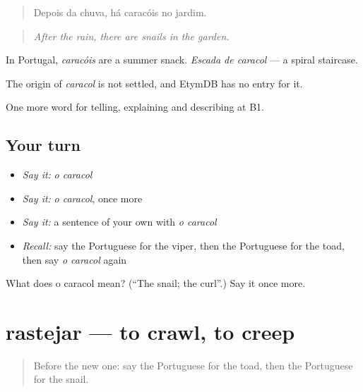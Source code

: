 \begin{quote}
Depois da chuva, há caracóis no jardim.
\end{quote}

\begin{quote}
\emph{After the rain, there are snails in the garden.}
\end{quote}

In Portugal, \emph{caracóis} are a summer snack. \emph{Escada de caracol} — a spiral staircase.

\begin{cousinweb}
The origin of \emph{caracol} is not settled, and EtymDB has no entry for it.
\end{cousinweb}

\begin{grammarlens}[title={What you've built}]
One more word for telling, explaining and describing at B1.
\end{grammarlens}

\subsection*{Your turn}
\begin{itemize}
\raggedright
  \item \emph{Say it:} \emph{o caracol}
  \item \emph{Say it:} \emph{o caracol}, once more
  \item \emph{Say it:} a sentence of your own with \emph{o caracol}
  \item \emph{Recall:} say the Portuguese for the viper, then the Portuguese for the toad, then say \emph{o caracol} again
\end{itemize}

\begin{tcolorbox}[breakable,colback=teal!4,colframe=teal!35!black,title={Before you move on}]
What does o caracol mean? (\textquotedblleft{}The snail; the curl\textquotedblright{}.) Say it once more.
\end{tcolorbox}
\section[rastejar]{rastejar — to crawl, to creep}

\label{lesson:PT-C461-rastejar}



\begin{quote}
Before the new one: say the Portuguese for the toad, then the Portuguese for the snail.
\end{quote}


